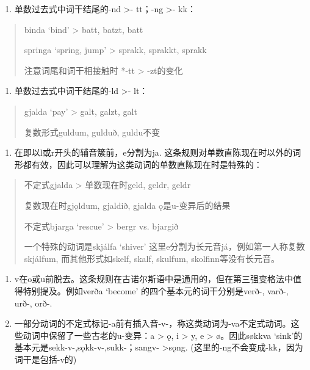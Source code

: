 \begin{enumerate}
  \def\labelenumi{\arabic{enumi})}
  \item
        单数过去式中词干结尾的-nd \textgreater- tt；-ng \textgreater- kk：
\end{enumerate}

\begin{quote}
  binda `bind‌' \textgreater{} batt, batzt, batt

  springa `spring, jump‌' \textgreater{} sprakk, sprakkt, sprakk

  注意词尾和词干相接触时 *-tt \textgreater{} -zt的变化
\end{quote}

\begin{enumerate}
  \def\labelenumi{\arabic{enumi})}
  \setcounter{enumi}{1}
  \item
        单数过去式中词干结尾的-ld \textgreater- lt：
\end{enumerate}

\begin{quote}
  gjalda `pay‌' \textgreater{} galt, galzt, galt

  复数形式guldum, gulduð, guldu不变
\end{quote}

\begin{enumerate}
  \def\labelenumi{\arabic{enumi})}
  \setcounter{enumi}{2}
  \item
        在即以l或r开头的辅音簇前，e分割为ja.
        这条规则对单数直陈现在时以外的词形都有效，因此可以理解为这类动词的单数直陈现在时是特殊的：
\end{enumerate}

\begin{quote}
  不定式gjalda \textgreater{} 单数现在时geld, geldr, geldr

  复数现在时gjǫldum, gjaldið, gjalda ǫ是u-变异后的结果

  不定式bjarga `rescue‌' \textgreater{} bergr vs. bjargið

  一个特殊的动词是skjálfa `shiver‌'
  这里e分割为长元音já，例如第一人称复数skjálfum, 而其他形式如skelf, skalf,
  skulfum, skolfinn等没有长元音。
\end{quote}

\begin{enumerate}
  \def\labelenumi{\arabic{enumi})}
  \setcounter{enumi}{3}
  \item
        v在o或u前脱去。这条规则在古诺尔斯语中是通用的，但在第三强变格法中值得特别提及。例如verða
        `become‌' 的四个基本元的词干分别是verð-, varð-, urð-, orð-.
  \item
        一部分动词的不定式标记-a前有插入音-v-，称这类动词为-va不定式动词。这些动词中保留了一些古老的u-变异：a
        \textgreater{} ǫ, i \textgreater{} y, e \textgreater{} ø。因此søkkva
        `sink‌'的基本元是sekk-v-,sǫkk-v-,sukk-；sangv- \textgreater sǫng.
        (这里的-ng不会变成-kk，因为词干是包括-v的)
\end{enumerate}

